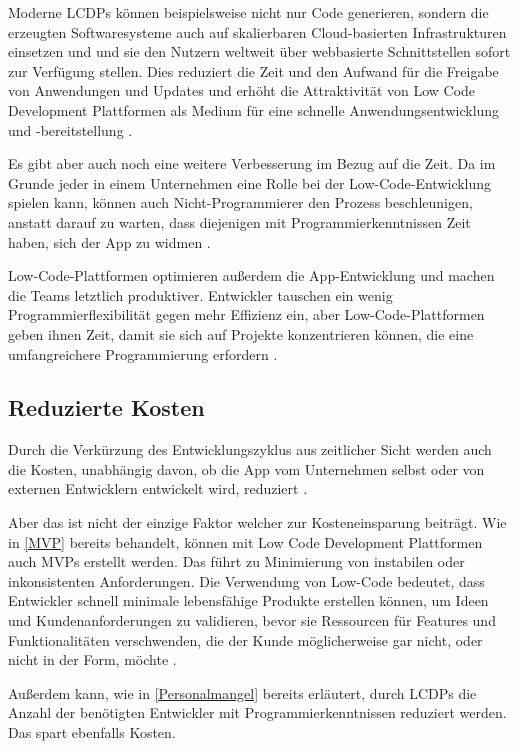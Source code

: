 \documentclass[12pt]{article} %
\begin{document}
	Moderne LCDPs können beispielsweise nicht nur Code generieren, sondern die erzeugten Softwaresysteme auch auf skalierbaren Cloud-basierten Infrastrukturen einsetzen und und sie den Nutzern weltweit über webbasierte Schnittstellen sofort zur Verfügung stellen. Dies reduziert die Zeit und den Aufwand für die Freigabe von Anwendungen und Updates und erhöht die Attraktivität von Low Code Development Plattformen als Medium für eine schnelle Anwendungsentwicklung und -bereitstellung \autocite{DiRuscio.2022}.
	
	Es gibt aber auch noch eine weitere Verbesserung im Bezug auf die Zeit. Da im Grunde jeder in einem Unternehmen eine Rolle bei der Low-Code-Entwicklung spielen kann, können auch Nicht-Programmierer den Prozess beschleunigen, anstatt darauf zu warten, dass diejenigen mit Programmierkenntnissen Zeit haben, sich der App zu widmen \autocite{Microsoft.2023}.
	
	Low-Code-Plattformen optimieren außerdem die App-Entwicklung und machen die Teams letztlich produktiver. Entwickler tauschen ein wenig Programmierflexibilität gegen mehr Effizienz ein, aber Low-Code-Plattformen geben ihnen Zeit, damit sie sich auf Projekte konzentrieren können, die eine umfangreichere Programmierung erfordern \autocite{Microsoft.2023}.
	
	\subsection{Reduzierte Kosten}	
	Durch die Verkürzung des Entwicklungszyklus aus zeitlicher Sicht werden auch die Kosten, unabhängig davon, ob die App vom Unternehmen selbst oder von externen Entwicklern entwickelt wird, reduziert \autocite{Sanchis.2020b}. \newline
	
	Aber das ist nicht der einzige Faktor welcher zur Kosteneinsparung beiträgt. Wie in \ref{MVP} bereits behandelt, können mit Low Code Development Plattformen auch MVPs erstellt werden. Das führt zu Minimierung von instabilen oder inkonsistenten Anforderungen. Die Verwendung von Low-Code bedeutet, dass Entwickler schnell minimale lebensfähige Produkte erstellen können, um Ideen und Kundenanforderungen zu validieren, bevor sie Ressourcen für Features und Funktionalitäten verschwenden, die der Kunde möglicherweise gar nicht, oder nicht in der Form, möchte \autocite{Sanchis.2020b}. \newline
	
	Außerdem kann, wie in \ref{Personalmangel} bereits erläutert, durch LCDPs die Anzahl der benötigten Entwickler mit Programmierkenntnissen reduziert werden. Das spart ebenfalls Kosten.  
	
\end{document}
